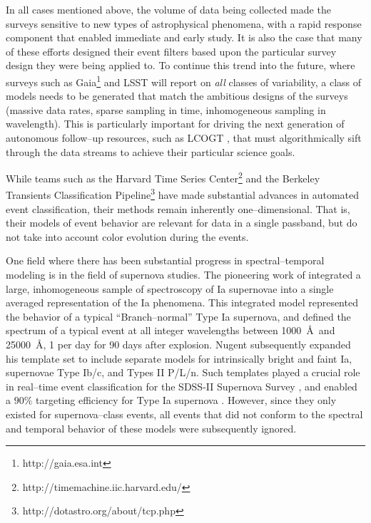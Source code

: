 In all cases mentioned above, the volume of data being collected made the
surveys sensitive to new types of astrophysical phenomena, with a rapid response
component that enabled immediate and early study.  It is also the case that many
of these efforts designed their event filters based upon the particular survey
design they were being applied to.  To continue this trend into the future,
where surveys such as Gaia\footnote{http://gaia.esa.int} and LSST will report on
{\it all} classes of variability, a class of models needs to be generated that
match the ambitious designs of the surveys (massive data rates, sparse sampling
in time, inhomogeneous sampling in wavelength).  This is particularly important
for driving the next generation of autonomous follow--up resources, such as
LCOGT \citep{2008AN....329..269H}, that must algorithmically sift through the
data streams to achieve their particular science goals.

 \smallskip

While teams such as the Harvard Time Series
Center\footnote{http://timemachine.iic.harvard.edu/} and the Berkeley Transients
Classification Pipeline\footnote{http://dotastro.org/about/tcp.php} have made
substantial advances in automated event classification, their methods remain
inherently one--dimensional. That is, their models of event behavior are
relevant for data in a single passband, but do not take into account color
evolution during the events.

One field where there has been substantial progress in spectral--temporal
modeling is in the field of supernova studies. The pioneering work of
\cite{2002PASP..114..803N} integrated a large, inhomogeneous sample of
spectroscopy of Ia supernovae into a single averaged representation of the Ia
phenomena. This integrated model represented the behavior of a typical
``Branch--normal'' Type Ia supernova, and defined the spectrum of a typical
event at all integer wavelengths between 1000~\AA~and 25000~\AA, 1 per day for
90 days after explosion.  Nugent subsequently expanded his template set to
include separate models for intrinsically bright and faint Ia, supernovae Type
Ib/c, and Types II P/L/n. Such templates played a crucial role in real--time
event classification for the SDSS-II Supernova Survey
\citep{2008AJ....135..338F}, and enabled a $90\%$ targeting efficiency for Type
Ia supernova \citep{2008AJ....135..348S}. However, since they only existed for
supernova--class events, all events that did not conform to the spectral and
temporal behavior of these models were subsequently ignored.

